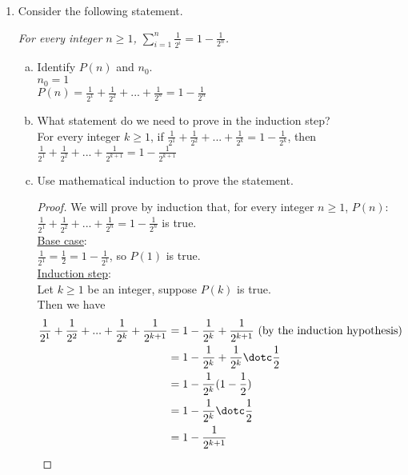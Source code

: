 \documentclass[12pt]{amsart}
\begin{document}
\begin{enumerate}[{\bfseries 1.}]
\newpage
\item Consider the following statement.

	\vspace{0.1in}
	\begin{center}
	\noindent
	\textit{For every integer $n\geq 1$, $\displaystyle\sum_{i=1}^{n}\frac{1}{2^{i}}=1-\frac{1}{2^{n}}$.}
	\end{center}

	\begin{enumerate}[(a)]
	\vspace{0.1in}
	\item Identify $P(n)$ and $n_{0}$.
	\vspace{0.1in}
	\\$n_{0} = 1$
	\\$P(n) = \frac{1}{2^1} + \frac{1}{2^2} + ... + \frac{1}{2^n} = 1-\frac{1}{2^n}$

	\vspace{0.1in}
	\item What statement do we need to prove in the induction step?
    	\vspace{0.1in}
    	\\For every integer $k\geq 1$, if $\frac{1}{2^1} + \frac{1}{2^2} + ... + \frac{1}{2^k} = 1-\frac{1}{2^k}$, then $\frac{1}{2^1} + \frac{1}{2^2} + ... + \frac{1}{2^{k+1}} = 1-\frac{1}{2^{k+1}}$

	\vspace{0.1in}
	\item Use mathematical induction to prove the statement.
    	\begin{proof}
    	\vspace{0.1in}
    	We will prove by induction that, for every integer $n \geq 1$, $P(n)$: $\frac{1}{2^1} + \frac{1}{2^2} + ... + \frac{1}{2^n} = 1-\frac{1}{2^n}$ is true.
    	\\\underline{Base case}:
    	\\$\frac{1}{2^1} = \frac{1}{2} = 1 - \frac{1}{2^1}$, so $P(1)$ is true.
    	\\\underline{Induction step}:
    	\\Let $k\geq 1$ be an integer, suppose $P(k)$ is true.
    	\\Then we have
		\begin{align*}
		\frac{1}{2^1} + \frac{1}{2^2} + ... + \frac{1}{2^k} + \frac{1}{2^{k+1}}&= 1-\frac{1}{2^k} + \frac{1}{2^{k+1}} \text{ (by the induction hypothesis)} \\
		&= 1 - \frac{1}{2^k} + \frac{1}{2^k}\dotc \frac{1}{2} \\
		&= 1 - \frac{1}{2^k}(1 - \frac{1}{2}) \\
		&= 1 - \frac{1}{2^k}\dotc \frac{1}{2} \\ 
		&= 1 - \frac{1}{2^{k+1}}
		\end{align*}
		\end{proof}
	\end{enumerate}


\end{enumerate}
\end{document}
